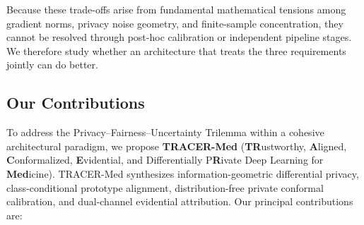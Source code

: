 \documentclass[3p,12pt]{elsarticle}
\theoremstyle{plain}
\theoremstyle{definition}
\begin{document}
Because these trade-offs arise from fundamental mathematical tensions among gradient norms, privacy noise geometry, and finite-sample concentration, they cannot be resolved through post-hoc calibration or independent pipeline stages. We therefore study whether an architecture that treats the three requirements jointly can do better.

\subsection{Our Contributions}
To address the Privacy--Fairness--Uncertainty Trilemma within a cohesive architectural paradigm, we propose \textbf{TRACER-Med} (\textbf{TR}ustworthy, \textbf{A}ligned, \textbf{C}onformalized, \textbf{E}vidential, and Differentially P\textbf{R}ivate Deep Learning for \textbf{Med}icine). TRACER-Med synthesizes information-geometric differential privacy, class-conditional prototype alignment, distribution-free private conformal calibration, and dual-channel evidential attribution. Our principal contributions are:
\end{document}
